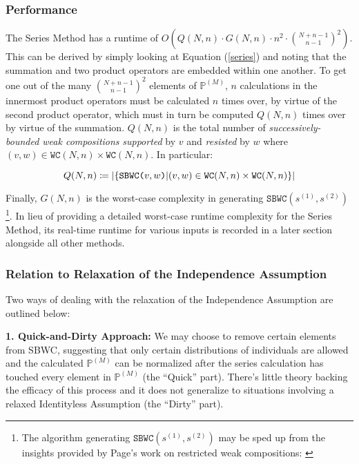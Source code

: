 \documentclass{article}
\DeclarePairedDelimiter\abs{\lvert}{\rvert}
\begin{document}
\subsubsection{Performance}
The Series Method has a runtime of $O(Q(N,n) \cdot G(N,n) \cdot n^2 \cdot {N+n-1 \choose n-1}^2 )$. This can be derived by simply looking at Equation (\ref{series}) and noting that the summation and two product operators are embedded within one another. To get one out of the many ${N+n-1 \choose n-1}^2$ elements of $\mathbb{P}^{(M)}$, $n$ calculations in the innermost product operators must be calculated $n$ times over, by virtue of the second product operator, which must in turn be computed $Q(N,n)$ times over by virtue of the summation. $Q(N,n)$ is the total number of \textit{successively-bounded weak compositions} \textit{supported} by $v$ and \textit{resisted} by $w$ where $(v,w) \in \texttt{WC}(N,n) \times \texttt{WC}(N,n)$. In particular:

\[
Q(N,n) \coloneqq \abs*{\{\texttt{SBWC($v, w$)} | (v,w) \in \texttt{WC}(N,n) \times \texttt{WC}(N,n) \}}
\]

Finally, $G(N,n)$ is the worst-case complexity in generating $\texttt{SBWC}(s^{(1)}, s^{(2)})$ \footnote{The algorithm generating $\texttt{SBWC}(s^{(1)}, s^{(2)})$ may be sped up from the insights provided by Page's work on restricted weak compositions: \cite{Page2012}}. In lieu of providing a detailed worst-case runtime complexity for the Series Method, its real-time runtime for various inputs is recorded in a later section alongside all other methods.

\subsubsection{Relation to Relaxation of the Independence Assumption} \label{sssec:relaxIndep}
Two ways of dealing with the relaxation of the Independence Assumption are outlined below:

\textbf{1. Quick-and-Dirty Approach:} We may choose to remove certain elements from SBWC, suggesting that only certain distributions of individuals are allowed and the calculated $\mathbb{P}^{(M)}$ can be normalized after the series calculation has touched every element in $\mathbb{P}^{(M)}$ (the ``Quick'' part). There's little theory backing the efficacy of this process and it does not generalize to situations involving a relaxed Identityless Assumption (the ``Dirty'' part).
\end{document}
